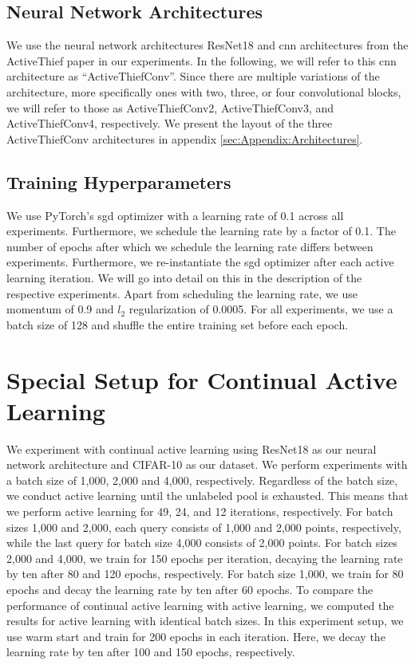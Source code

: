 \subsection{Neural Network Architectures}
\label{sec:ExperimentSetup:NNArchitectures}
We use the neural network architectures ResNet18 \cite{he2016deep} and \gls{cnn} architectures from the ActiveThief paper \cite{pal2020activethief} in our experiments.
In the following, we will refer to this \gls{cnn} architecture as \enquote{ActiveThiefConv}. Since there are multiple variations of the architecture, more specifically
ones with two, three, or four convolutional blocks, we will refer to those as ActiveThiefConv2, ActiveThiefConv3, and ActiveThiefConv4, respectively. We present the
layout of the three ActiveThiefConv architectures in appendix \ref{sec:Appendix:Architectures}.


\subsection{Training Hyperparameters}
\label{sec:ExperimentSetup:Hyperparameters}
We use PyTorch's \gls{sgd} optimizer with a learning rate of 0.1 across all experiments. Furthermore, we schedule the learning rate by a factor of 0.1. The number of
epochs after which we schedule the learning rate differs between experiments. Furthermore, we re-instantiate the \gls{sgd} optimizer after each active learning
iteration. We will go into detail on this in the description of the respective experiments. Apart from scheduling the learning rate, we use momentum \cite{cutkosky2020momentum}
of 0.9 and $l_2$ regularization of 0.0005. For all experiments, we use a batch size of 128 and shuffle the entire training set before each epoch.


\section{Special Setup for Continual Active Learning}
\label{sec:Methodology:CALsetup}
We experiment with continual active learning using ResNet18 as our neural network architecture and CIFAR-10 as our dataset. We perform experiments with a batch size of 1,000,
2,000 and 4,000, respectively. Regardless of the batch size, we conduct active learning until the unlabeled pool is exhausted. This means that we perform active learning for
49, 24, and 12 iterations, respectively. For batch sizes 1,000 and 2,000, each query consists of 1,000 and 2,000 points, respectively, while the last query for batch size 4,000 consists of 2,000 points.
For batch sizes 2,000 and 4,000, we train for 150 epochs per iteration, decaying the learning rate by ten after 80 and 120 epochs, respectively. For batch size 1,000, we
train for 80 epochs and decay the learning rate by ten after 60 epochs. To compare the performance of continual active learning with active learning, we computed the results
for active learning with identical batch sizes. In this experiment setup, we use warm start and train for 200 epochs in each iteration. Here, we
decay the learning rate by ten after 100 and 150 epochs, respectively.

